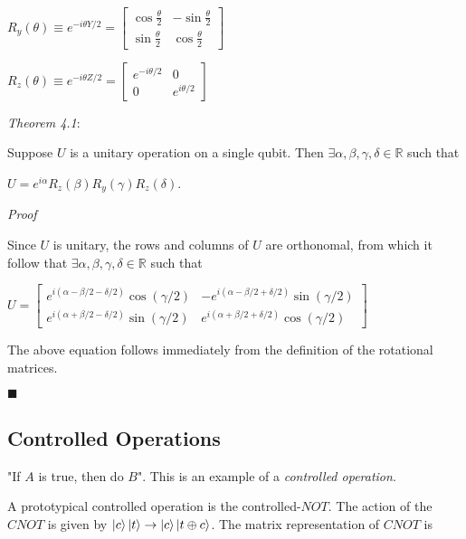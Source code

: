 \documentclass{article}
\begin{document}
  \begin{center}
    $R_{y}(\theta) \equiv e^{-i\theta Y / 2} = 
    \begin{bmatrix}
      \cos{\frac{\theta}{2}} & -\sin{\frac{\theta}{2}} \\
      \sin{\frac{\theta}{2}} & \cos{\frac{\theta}{2}}
    \end{bmatrix}
    $
  \end{center}

  \begin{center}
    $R_{z}(\theta) \equiv e^{-i\theta Z / 2} = 
    \begin{bmatrix}
      e^{-i\theta / 2} & 0 \\
      0 & e^{i\theta / 2}
    \end{bmatrix}
    $
  \end{center}


\emph{Theorem 4.1}:

Suppose $U$ is a unitary operation on a single qubit.
Then $\exists \alpha, \beta, \gamma, \delta \in \mathbb{R}$
such that
  \begin{center}
    $U = e^{i\alpha}R_{z}(\beta)R_{y}(\gamma)R_{z}(\delta)$.
  \end{center}

\emph{Proof}

Since $U$ is unitary, the rows and columns of $U$ are orthonomal, from which it
follow that $\exists \alpha, \beta, \gamma, \delta \in \mathbb{R}$ such that
\begin{center}
  $U = \begin{bmatrix}
  e^{i(\alpha-\beta/2-\delta/2)}\cos{(\gamma/2)} &
  -e^{i(\alpha-\beta/2+\delta/2)}\sin{(\gamma/2)} \\
  e^{i(\alpha+\beta/2-\delta/2)}\sin{(\gamma/2)} &
  e^{i(\alpha+\beta/2+\delta/2)}\cos{(\gamma/2)}
  \end{bmatrix}$
\end{center}

The above equation follows immediately from the definition of the rotational
matrices.

$\blacksquare$

\subsection{Controlled Operations}
"If $A$ is true, then do $B$". This is an example of a
\emph{controlled operation}.

A prototypical controlled operation is the controlled-$NOT$. The action of
the $CNOT$ is given by $\ket{c}\ket{t} \rightarrow \ket{c}\ket{t \oplus c}$.
The matrix representation of $CNOT$ is
\end{document}

